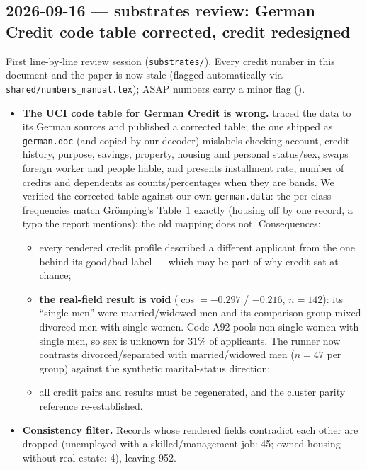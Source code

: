 \documentclass{article}
\begin{document}
\subsection*{2026-09-16 --- substrates review: German Credit code table corrected, credit redesigned}
First line-by-line review session (\texttt{substrates/}). Every credit number in this document and the paper
is now stale (flagged \dag{} automatically via \texttt{shared/numbers\_manual.tex}); ASAP numbers carry a
minor flag (\ddag).
\begin{itemize}
  \item \textbf{The UCI code table for German Credit is wrong.} \citet{groemping2019southgerman} traced the
        data to its German sources and published a corrected table; the one shipped as \texttt{german.doc}
        (and copied by our decoder) mislabels checking account, credit history, purpose, savings, property,
        housing and personal status/sex, swaps foreign worker and people liable, and presents installment
        rate, number of credits and dependents as counts/percentages when they are bands. We verified the
        corrected table against our own \texttt{german.data}: the per-class frequencies match Grömping's
        Table~1 exactly (housing off by one record, a typo the report mentions); the old mapping does not.
        Consequences:
        \begin{itemize}
          \item every rendered credit profile described a different applicant from the one behind its
                good/bad label --- which may be part of why credit \crossinf{} sat at chance;
          \item \textbf{the real-field result is void} ($\cos=-0.297$ / $-0.216$, $n{=}142$): its ``single
                men'' were married/widowed men and its comparison group mixed divorced men with single
                women. Code A92 pools non-single women with single men, so sex is unknown for 31\% of
                applicants. The runner now contrasts divorced/separated with married/widowed men ($n{=}47$
                per group) against the synthetic marital-status direction;
          \item all credit pairs and results must be regenerated, and the cluster parity reference
                re-established.
        \end{itemize}
  \item \textbf{Consistency filter.} Records whose rendered fields contradict each other are dropped
        (unemployed with a skilled/management job: 45; owned housing without real estate: 4), leaving 952.

\end{itemize}
\end{document}

